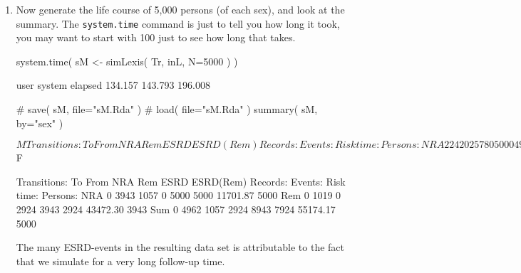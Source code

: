 \begin{enumerate}[resume]
\begin{itemize}
\item The other input for the simulation is the transitions, which is
  a list with an element for each transient state (that is ``NRA'' and
  ``Rem''), each of which is again a list with names equal to the
  states that can be reached from the transient state. The content of
  the list will be \texttt{glm} objects, in this case the models we
  just fitted, describing the transition rates:
\begin{Schunk}
\begin{Sinput}
 Tr <- list( "NRA" = list( "Rem"  = mr,
                           "ESRD" = mx ),
             "Rem" = list( "ESRD(Rem)" = mx ) )
\end{Sinput}
\end{Schunk}
\end{itemize}


\item Now generate the life course of 5,000 persons (of each sex), and
  look at the summary.  The \texttt{system.time} command is just to
  tell you how long it took, you may want to start with 100 just to
  see how long that takes.
\begin{Schunk}
\begin{Sinput}
 system.time( sM <- simLexis( Tr, inL, N=5000 ) )
\end{Sinput}
\begin{Soutput}
   user  system elapsed 
134.157 143.793 196.008 
\end{Soutput}
\begin{Sinput}
 # save( sM, file="sM.Rda" )
 # load(     file="sM.Rda" )
 summary( sM, by="sex" )
\end{Sinput}
\begin{Soutput}
$M
     
Transitions:
     To
From  NRA  Rem ESRD ESRD(Rem)  Records:  Events: Risk time:  Persons:
  NRA   2 2420 2578         0      5000     4998   19650.85      5000
  Rem   0  585    0      1835      2420     1835   24310.30      2420
  Sum   2 3005 2578      1835      7420     6833   43961.14      5000

$F
     
Transitions:
     To
From  NRA  Rem ESRD ESRD(Rem)  Records:  Events: Risk time:  Persons:
  NRA   0 3943 1057         0      5000     5000   11701.87      5000
  Rem   0 1019    0      2924      3943     2924   43472.30      3943
  Sum   0 4962 1057      2924      8943     7924   55174.17      5000
\end{Soutput}
\end{Schunk}
The many ESRD-events in the resulting data set is attributable to the
fact that we simulate for a very long follow-up time.



\end{enumerate}
